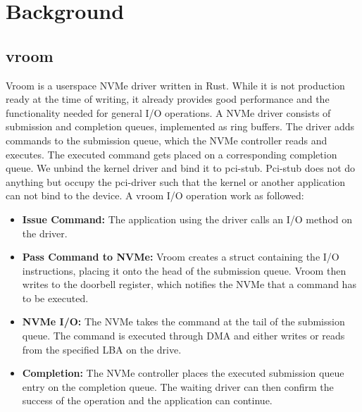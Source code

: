 \chapter{Background}

\section{vroom}
Vroom is a userspace NVMe driver written in Rust. While it is not production ready at the time of writing, it already provides good performance and the functionality needed for general I/O operations.
A NVMe driver consists of submission and completion queues, implemented as ring buffers. The driver adds commands to the submission queue, which the NVMe controller reads and executes. The executed command gets placed on a corresponding completion queue.
We unbind the kernel driver and bind it to pci-stub. Pci-stub does not do anything but occupy the pci-driver such that the kernel or another application can not bind to the device.
A vroom I/O operation work as followed:
\begin{itemize}
    \item \textbf{Issue Command:} The application using the driver calls an I/O method on the driver.
    \item \textbf{Pass Command to NVMe:} Vroom creates a struct containing the I/O instructions, placing it onto the head of the submission queue. Vroom then writes to the doorbell register, which notifies the NVMe that a command has to be executed.
    \item \textbf{NVMe I/O:} The NVMe takes the command at the tail of the submission queue. The command is executed through DMA and either writes or reads from the specified LBA on the drive.
    \item \textbf{Completion:} The NVMe controller places the executed submission queue entry on the completion queue. The waiting driver can then confirm the success of the operation and the application can continue.
\end{itemize}

